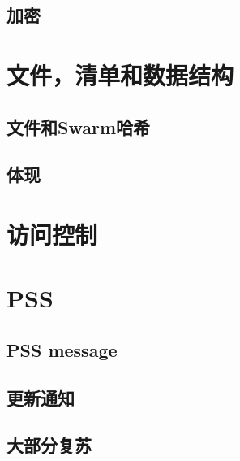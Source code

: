 \subsection{加密\statusyellow}\label{spec:format:encryption}


\section{文件，清单和数据结构\statusyellow}\label{spec:format:data-structures}
\subsection{文件和Swarm哈希\statusyellow}\label{spec:format:files}

\subsection{体现\statusyellow}\label{spec:format:manifests}

%


\section{访问控制\statusgreen}\label{spec:format:access-control}


\section{PSS \statusyellow}

\subsection{PSS message\statusgreen}
\label{spec:format:pss-messsage}

\subsection{更新通知\statusred}\label{spec:format:update-notifications}
%

\subsection{大部分复苏\statusyellow}\label{spec:format:recovery}


